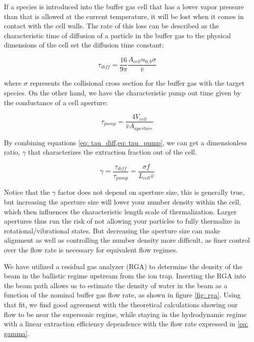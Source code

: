 If a species is introduced into the buffer gas cell that has a lower vapor pressure than that is allowed at the current temperature, it will be lost when it comes in contact with the cell walls. The rate of this loss can be described as the  characteristic time of diffusion of a particle in the buffer gas to the physical dimensions of the cell set the diffusion time constant:

\begin{equation}
	\tau_{diff} = \frac{16}{9 \pi} \frac{A_{cell} n_{0,b} \sigma}{\bar{v}} \label{eq: tau_diff}
\end{equation}

where $\sigma$ represents the collisional cross section for the buffer gas with the target species. On the other hand, we have the characteristic pump out time given by the conductance of a cell aperture:

\begin{equation}
	\tau_{pump}=\frac{4V_{cell}}{\bar{v}A_{aperture}} \label{eq: tau_pump}
\end{equation}

By combining equations \cref{eq: tau_diff,eq: tau_pump}, we can get a dimensionless ratio, $\gamma$ that characterizes the extraction fraction out of the cell.

\begin{equation}
	\gamma = \frac{\tau_{diff}}{\tau_{pump}} = \frac{\sigma f}{L_{cell} \bar{v}} \label{eq: gamma}
\end{equation}

Notice that the $\gamma$ factor does not depend on aperture size, this is generally true, but increasing the aperture size will lower your number density within the cell, which then influences the characteristic length scale of thermalization. Larger apertures thus run the risk of not allowing your particles to fully thermalize in rotational/vibrational states. But decreasing the aperture size can make alignment as well as controlling the number density more difficult, as finer control over the flow rate is necessary for equivalent flow regimes.

We have utilized a residual gas analyzer (RGA) to determine the density of the beam in the ballistic regime upstream from the ion trap. Inserting the RGA into the beam path allows us to estimate the density of water in the beam as a function of the nominal buffer gas flow rate, as shown in figure \ref{fig: rga}. Using that fit, we find good agreement with the theoretical calculations showing our flow to be near the supersonic regime, while staying in the hydrodynamic regime with a linear extraction efficiency dependence with the flow rate expressed in \ref{eq: gamma}.

